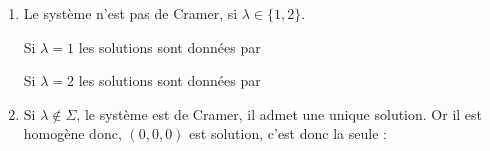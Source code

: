 \documentclass[a4paper, 11pt,reqno]{article}
\begin{document}
\begin{correction}
\begin{enumerate}
\item Le système n'est pas de Cramer, si $\lambda\in \{1,2\}$.

Si $\lambda=1$ les solutions sont données par 

Si $\lambda=2$ les solutions sont données par 

\item Si $\lambda\notin \Sigma$, le système est de Cramer, il admet une unique solution. Or il est homogène donc, $(0,0,0)$ est solution, c'est donc la seule :
\end{enumerate}
\end{correction}
\end{document}
